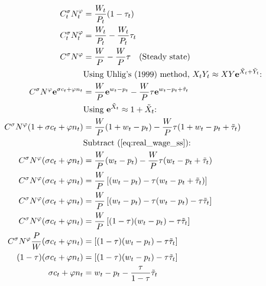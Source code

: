 \begin{align}
    C_t^\sigma N_t^\varphi &= \frac{W_t}{P_t}(1-\tau_t) \\
    C_t^\sigma N_t^\varphi &= \frac{W_t}{P_t} - \frac{W_t}{P_t}\tau_t \\
    C^\sigma N^\varphi &= \frac{W}{P} - \frac{W}{P}\tau \label{eq:real_wage_ss} \quad \text{(Steady state)}\\
    &\text{Using Uhlig's (1999) method, $X_tY_t \approx XY\mathbf{e}^{\tilde{X}_t + \tilde{Y}_t}$: }\\
    C^\sigma N^\varphi\mathbf{e}^{\sigma c_t + \varphi n_t} &= \frac{W}{P}\mathbf{e}^{w_t - p_t} - \frac{W}{P}\tau \mathbf{e}^{w_t - p_t + \tilde{\tau}_t}\\
    &\text{Using $\mathbf{e}^{\tilde{X}_t} \approx 1 + {\tilde{X}_t}$: }\\
    C^\sigma N^\varphi({1+\sigma c_t + \varphi n_t}) &= \frac{W}{P}({1+ w_t - p_t}) - \frac{W}{P}\tau ({1+ w_t - p_t + \tilde{\tau}_t})\\
    &\text{Subtract (\ref{eq:real_wage_ss}): } \\
    C^\sigma N^\varphi({\sigma c_t + \varphi n_t}) &= \frac{W}{P}({w_t - p_t}) - \frac{W}{P}\tau ({w_t - p_t + \tilde{\tau}_t})\\
    C^\sigma N^\varphi({\sigma c_t + \varphi n_t}) &= \frac{W}{P}\left[({w_t - p_t}) - \tau ({w_t - p_t + \tilde{\tau}_t})\right]\\
    C^\sigma N^\varphi({\sigma c_t + \varphi n_t}) &= \frac{W}{P}\left[({w_t - p_t}) - \tau ({w_t - p_t}) - \tau\tilde{\tau}_t\right]\\
    C^\sigma N^\varphi({\sigma c_t + \varphi n_t}) &= \frac{W}{P}\left[(1-\tau)({w_t - p_t}) - \tau\tilde{\tau}_t\right]\\
    C^\sigma N^\varphi \frac{P}{W} ({\sigma c_t + \varphi n_t})  &= \left[(1-\tau)({w_t - p_t}) - \tau\tilde{\tau}_t\right]\\
    (1-\tau)({\sigma c_t + \varphi n_t})  &= \left[(1-\tau)({w_t - p_t}) - \tau\tilde{\tau}_t\right]\\
    {\sigma c_t + \varphi n_t}  &= {w_t - p_t} - \frac{\tau}{1-\tau}\tilde{\tau}_t\\
\end{align}
